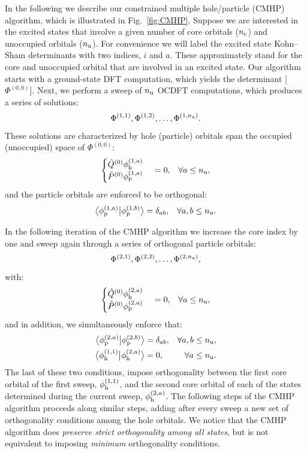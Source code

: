 \documentclass[8.5pt,twoside,twocolumn]{article}
\newcommand{\braket}[3][0]
{\ifthenelse{\equal{#1}{0}}{\left\langle #2 \middle| #3 \right\rangle}
{\ifthenelse{\equal{#1}{1}}{\big\langle #2 \big| #3 \big\rangle}
{\ifthenelse{\equal{#1}{2}}{\Big\langle #2 \Big| #3 \Big\rangle}
{\ifthenelse{\equal{#1}{3}}{\bigg\langle #2 \bigg| #3 \bigg\rangle}
{\ifthenelse{\equal{#1}{4}}{\Bigg\langle #2 \Bigg| #3 \Bigg\rangle}
{Error}}}}}
}
\begin{document}
In the following we describe our constrained multiple hole/particle (CMHP) algorithm, which is illustrated in Fig.~\ref{fig:CMHP}.
Suppose we are interested in the excited states that involve a given number of core orbitals ($n_{\rm c}$) and unoccupied orbitals ($n_{\rm u}$).
For convenience we will label the excited state Kohn--Sham determinants with two indices, $i$ and $a$.  These approximately stand for the core and unoccupied orbital that are involved in an excited state.
Our algorithm starts with a ground-state DFT computation, which yields the determinant [$\Phi^{(0,0)}$].
Next, we perform a sweep of $n_{\rm u}$ OCDFT computations, which produces a series of solutions:
\begin{equation}
\Phi^{(1,1)}, \Phi^{(1,2)}, \ldots, \Phi^{(1,n_{\rm u})}.
\end{equation}
These solutions are characterized by hole (particle) orbitals span the occupied (unoccupied) space of $\Phi^{(0,0)}$:
\begin{align}
\begin{cases}
\hat{Q}^{(0)}\phi_{\rm h}^{(1,a)}\\
\hat{P}^{(0)}\phi_{\rm p}^{(1,a)}
\end{cases} &= 0,&\forall a \leq n_{\rm u},
\end{align}
and the particle orbitals are enforced to be orthogonal:
\begin{align}
\braket[1]{\phi^{(1,a)}_{\rm p}}{\phi^{(1,b)}_{\rm p}} &= \delta_{ab},&\forall a,b \leq n_{\rm u}.
\end{align}


In the following iteration of the CMHP algorithm we increase the core index by one and sweep again through a series of orthogonal particle orbitals:
\begin{equation}
\Phi^{(2,1)}, \Phi^{(2,2)}, \ldots, \Phi^{(2,n_{\rm u})},
\end{equation}
with:
\begin{align}
\begin{cases}
\hat{Q}^{(0)}\phi_{\rm h}^{(2,a)}\\
\hat{P}^{(0)}\phi_{\rm p}^{(2,a)}
\end{cases} &= 0,&\forall a \leq n_{\rm u},
\end{align}
and in addition, we simultaneously enforce that:
\begin{align}
\braket[1]{\phi^{(2,a)}_{\rm p}}{\phi^{(2,b)}_{\rm p}} &= \delta_{ab},&\forall a,b \leq n_{\rm u},\\
\braket[1]{\phi^{(1,1)}_{\rm h}}{\phi^{(2,a)}_{\rm h}} &=0,&\forall a \leq n_{\rm u}.
\end{align}
The last of these two conditions, impose orthogonality between the first core orbital of the first sweep, $\phi^{(1,1)}_{\rm h}$, and the second core orbital of each of the states determined during the current sweep, $\phi^{(2,a)}_{\rm h}$.
The following steps of the CMHP algorithm proceeds along similar steps, adding after every sweep a new set of orthogonality conditions among the hole orbitals.
We notice that the CMHP algorithm does \textit{preserve strict orthogonality among all states}, but is not equivalent to imposing \textit{minimum} orthogonality conditions.
\end{document}
